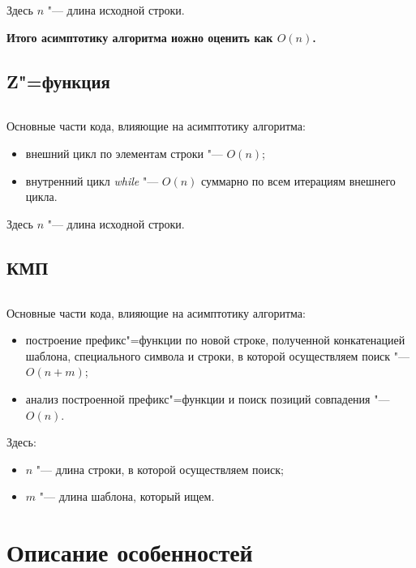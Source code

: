 \documentclass[otchet]{../SCWorks}
\begin{document}
Здесь $n$ "--- длина исходной строки.

\textbf{Итого асимптотику алгоритма иожно оценить как $O(n)$.}

\subsection{Z"=функция}
\small
\inputminted[breaklines]{cpp}{./z_function.cpp}
\normalsize

Основные части кода, влияющие на асимптотику алгоритма:

\begin{itemize}
	\item внешний цикл по элементам строки "--- $O(n)$;
	\item внутренний цикл \textit{while} "--- $O(n)$ суммарно по всем итерациям внешнего цикла.
\end{itemize}

Здесь $n$ "--- длина исходной строки.

\subsection{КМП}
\small
\inputminted[breaklines]{cpp}{./kmp.cpp}
\normalsize

Основные части кода, влияющие на асимптотику алгоритма:

\begin{itemize}
	\item построение префикс"=функции по новой строке, полученной конкатенацией шаблона, специального символа и строки, в которой осуществляем поиск "--- $O(n + m)$;
	\item анализ построенной префикс"=функции и поиск позиций совпадения "--- $O(n)$.
\end{itemize}

Здесь:
\begin{itemize}
	\item[$\bullet$] $n$ "--- длина строки, в которой осуществляем поиск;
	\item[$\bullet$] $m$ "--- длина шаблона, который ищем.
\end{itemize}

\section{Описание особенностей}
\end{document}

